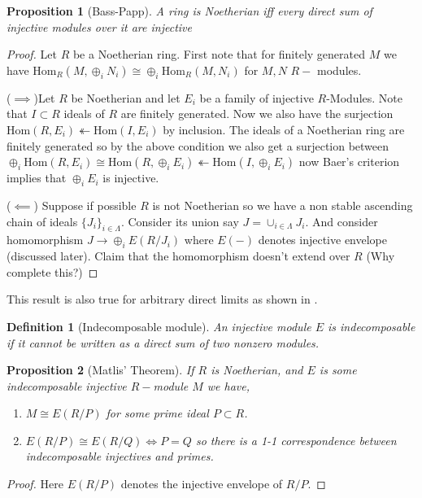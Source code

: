 \documentclass[12pt]{article}
\numberwithin{equation}{section}
\newcommand{\Hom}{{\mathrm{Hom}}}
\newtheorem{definition}{Definition}[section]
\newtheorem{proposition}{Proposition}[section]
\begin{document}
	\begin{proposition}[Bass-Papp]
		A ring is Noetherian iff every direct sum of injective modules over it are injective
	\end{proposition}
	\begin{proof}
		Let $R$ be a Noetherian ring. First note that for finitely generated $M$ we have $\Hom_R(M, \oplus_i N_i) \cong \oplus_i \Hom_R(M,N_i)$ for $M,N$ $R-$ modules.
		
		($\implies $)Let $R$ be Noetherian and let $E_i $ be a family of injective $R$-Modules. Note that $I \subset R$ ideals of $R$ are finitely generated. Now we also have the surjection $ \Hom(R,E_i) \twoheadleftarrow \Hom(I,E_i) $ by inclusion. The ideals of a Noetherian ring are finitely generated so by the above condition we also get a surjection between $\oplus_i \Hom (R, E_i) \cong \Hom(R, \oplus_i E_i) \twoheadleftarrow \Hom(I, \oplus_i E_i)$ now Baer's criterion implies that $\oplus_i E_i$ is injective.
		
		($\impliedby $) Suppose if possible $R$ is not Noetherian so we have a non stable ascending chain of ideals $\{J_i\}_{i \in \Lambda}$. Consider its union say $J= 	\cup_{i \in \Lambda} J_i$. And consider homomorphism $J \to \oplus_i E(R/J_i)$ where $E(-)$ denotes injective envelope (discussed later). Claim that the homomorphism doesn't extend over $R$ (Why complete this?)
	\end{proof}
	This result is also true for arbitrary direct limits as shown in \cite[Th. 3.46]{lam2012lectures}.
	\begin{definition}[Indecomposable module]
			An injective module $E$ is indecomposable if it cannot be written as a direct sum of two nonzero modules.
	\end{definition}
	
	\begin{proposition}[Matlis' Theorem]
		If $R$ is Noetherian, and $E$ is some indecomposable injective $R-$module $M$ we have,
		\begin{enumerate}
			\item $M \cong E(R/P)$ for some prime ideal $P\subset R$.
			\item $E(R/P)\cong E(R/Q) \iff P=Q$ so there is a 1-1 correspondence between indecomposable injectives and primes.
		\end{enumerate} 
	\end{proposition}
	\begin{proof}
		Here $E(R/P)$ denotes the injective envelope of $R/P$.	
	\end{proof}
	
\end{document}
